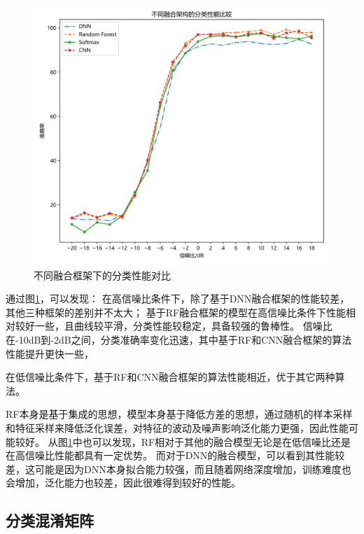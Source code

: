 \begin{figure}[!h]
	\centering
	\includegraphics[scale=0.6]{figures/chapter_4/fig_4_5}
	\caption{不同融合框架下的分类性能对比}\label{sec:fig_4_5}
\end{figure}

通过图\ref{sec:fig_4_5}，可以发现：
在高信噪比条件下，除了基于DNN融合框架的性能较差，其他三种框架的差别并不太大；
基于RF融合框架的模型在高信噪比条件下性能相对较好一些，且曲线较平滑，分类性能较稳定，具备较强的鲁棒性。
信噪比在-10dB到-2dB之间，分类准确率变化迅速，其中基于RF和CNN融合框架的算法性能提升更快一些，

在低信噪比条件下，基于RF和CNN融合框架的算法性能相近，优于其它两种算法。\par

RF本身是基于集成的思想，模型本身基于降低方差的思想，通过随机的样本采样和特征采样来降低泛化误差，对特征的波动及噪声影响泛化能力更强，因此性能可能较好。
从图\ref{sec:fig_4_5}中也可以发现，RF相对于其他的融合模型无论是在低信噪比还是在高信噪比性能都具有一定优势。
而对于DNN的融合模型，可以看到其性能较差，这可能是因为DNN本身拟合能力较强，而且随着网络深度增加，训练难度也会增加，泛化能力也较差，因此很难得到较好的性能。\par

\subsection{分类混淆矩阵}

